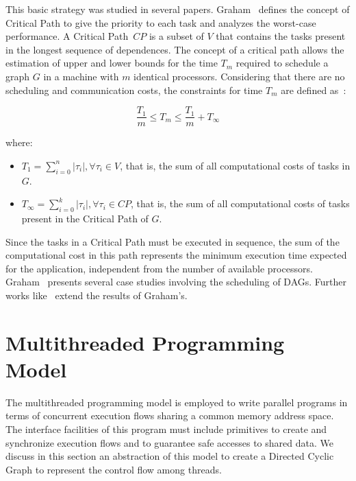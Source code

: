 \documentclass[twocolumn]{svjour3}
\begin{document}
This basic strategy was studied in several papers. Graham~\cite{Graham66} defines the concept of Critical Path to give the priority to each task and analyzes the  worst-case performance. A Critical Path~$CP$ is a subset of $V$ that contains the tasks present in the longest sequence of dependences. The concept of a critical path allows the estimation of upper and lower bounds for the time $T_m$ required to schedule a graph $G$ in a machine with $m$ identical processors.
Considering that there are no scheduling and communication costs, the constraints for time $T_m$ are defined as~\cite{Graham66}: 

	\begin{equation}
	\frac{T_1}{m} \le T_m \le \frac{T_1}{m} + T_\infty
	\end{equation}

\noindent where:
\begin{itemize}
  \item  $T_{1} = \sum_{i=0}^{n} |\tau_{i}| , \forall   \tau_{i} \in V$, that is, the sum of all computational costs of tasks in $G$.
\item $T_{\infty} = \sum_{i=0}^{k} |\tau_{i}| ,  \forall   \tau_{i} \in CP$, that is, the sum of all computational costs of tasks present in the Critical Path of $G$. 
\end{itemize}

Since the tasks in a Critical Path must be executed in sequence, the sum of the computational cost in this path represents the minimum execution time expected for the application, independent from the number of available processors. Graham~\cite{Graham76}  presents several case studies involving the scheduling of DAGs. Further works like~\cite{bartal95,karger96,Albers99,Fleischer2000} extend the results of Graham's.

\section{Multithreaded Programming Model}\label{sec:proginter}

The multithreaded programming model is employed to write parallel programs in terms of concurrent execution flows sharing a common memory address space. The interface facilities of this program must include primitives to create and synchronize execution flows and to guarantee safe accesses to shared data. We discuss in this section an abstraction of this model to create a Directed Cyclic Graph to represent the control flow among threads.
\end{document}

